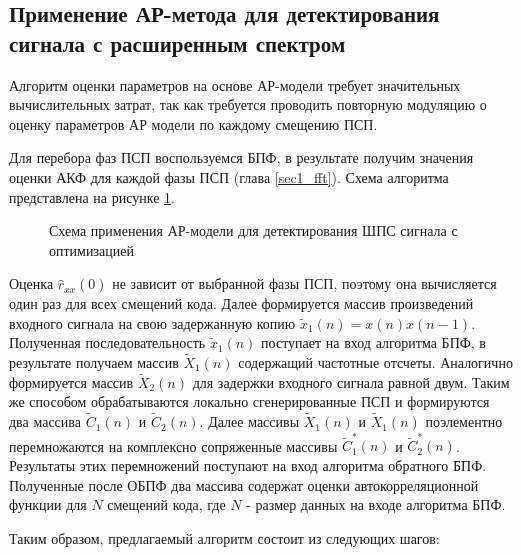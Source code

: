 \subsection{Применение АР-метода для детектирования сигнала с расширенным спектром}
\label{l:sec3_lpc_for_1}

Алгоритм оценки параметров на основе АР-модели требует значительных вычислительных затрат, так как требуется проводить
повторную модуляцию о оценку параметров АР модели по каждому смещению ПСП.

Для перебора фаз ПСП воспользуемся БПФ, в результате получим значения оценки АКФ для каждой фазы ПСП (глава \ref{sec1_fft}).
Схема алгоритма представлена на рисунке \ref{pic:lpc_basic2}. 

\begin{figure}[H]
	\center{}
	\caption{Схема применения АР-модели для детектирования ШПС сигнала с оптимизацией}
	\label{pic:lpc_basic2}
\end{figure}

Оценка ${\hat{r}_{xx}(0)}$ не зависит от выбранной фазы ПСП, поэтому она вычисляется один
раз для всех смещений кода. Далее формируется массив произведений входного сигнала на
свою задержанную копию ${\tilde{x}_1(n)=x(n)x(n-1)}$. Полученная последовательность  
${\tilde{x}_1(n)}$ поступает на вход алгоритма БПФ, в результате получаем массив ${\tilde{X}_1(n)}$
содержащий частотные отсчеты. Аналогично формируется массив  ${\tilde{X}_2(n)}$ для
задержки входного сигнала равной двум. Таким же способом обрабатываются локально
сгенерированные ПСП и формируются два массива ${\tilde{C}_1(n)}$ и ${\tilde{C}_2(n)}$.
Далее массивы ${\tilde{X}_1(n)}$ и ${\tilde{X}_1(n)}$ поэлементно перемножаются
на комплексно сопряженные массивы ${\tilde{C}_1^*(n)}$ и ${\tilde{C}_2^*(n)}$.
Результаты этих перемножений поступают на вход алгоритма обратного
БПФ. Полученные после ОБПФ два массива содержат оценки автокорреляционной функции для ${N}$ 
смещений кода, где  ${N}$ - размер данных на входе алгоритма БПФ.

Таким образом, предлагаемый алгоритм состоит из следующих шагов:

